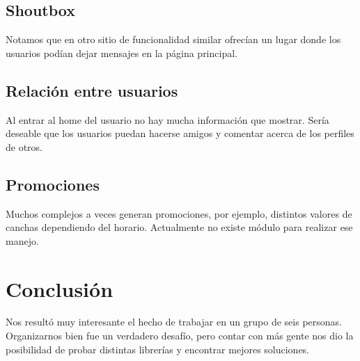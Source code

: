 \documentclass[a4paper,11pt]{article}
\begin{document}
\subsection{Shoutbox}
Notamos que en otro sitio de funcionalidad similar ofrecían un lugar donde los
usuarios podían dejar mensajes en la página principal.

\subsection{Relación entre usuarios}
Al entrar al home del usuario no hay mucha información que mostrar. Sería
deseable que los usuarios puedan hacerse amigos y comentar acerca de los perfiles
de otros.

\subsection{Promociones}
Muchos complejos a veces generan promociones, por ejemplo, distintos valores
de canchas dependiendo del horario. Actualmente no existe módulo para realizar
ese manejo.

\section{Conclusión}
Nos resultó muy interesante el hecho de trabajar en un grupo de seis personas.
Organizarnos bien fue un verdadero desafío, pero contar con más gente nos dio la
posibilidad de probar distintas librerías y encontrar mejores soluciones.
\end{document}
